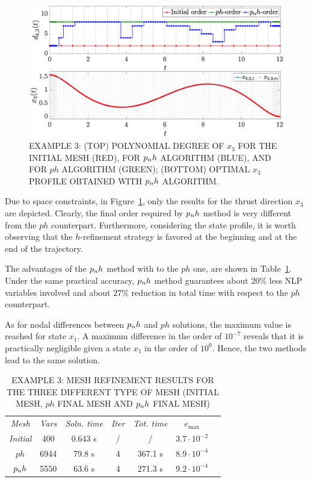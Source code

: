 \begin{figure}[t]
	\centering
	\includegraphics[trim={1cm 0.1cm 2cm 1.05cm},clip,width=1.\linewidth]{Img/pnh1_free}
	\caption{EXAMPLE 3: (TOP) POLYNOMIAL DEGREE OF $x_{3}$ FOR THE INITIAL MESH (RED), FOR $p_{n}h$ ALGORITHM (BLUE), AND FOR $ph$ ALGORITHM (GREEN); (BOTTOM) OPTIMAL $x_3$ PROFILE OBTAINED WITH $p_{n}h$ ALGORITHM.}
	\label{fig:pnh1free}
\end{figure}

Due to space constraints, in Figure~\ref{fig:pnh1free}, only the results for the thrust direction $x_3$ are depicted. Clearly, the final order required by $p_{n}h$ method is very different from the $ph$ counterpart. Furthermore, considering the state profile, it is worth observing that the $h$-refinement strategy is favored at the beginning and at the end of the trajectory.

The advantages of the $p_{n}h$ method with to the $ph$ one, are shown in Table~\ref{tab:tablefree}. Under the same practical accuracy, $p_{n}h$ method guarantees about $20\%$ less NLP variables involved and about $27\%$ reduction in total time with respect to the $ph$ counterpart.

As for nodal differences between $p_{n}h$ and $ph$ solutions, the maximum value is reached for state $x_1$. A maximum difference in the order of $10^{-7}$ reveals that it is practically negligible given a state $x_1$ in the order of $10^0$. Hence, the two methods lead to the same solution.
\begin{table}[t]
	\caption{EXAMPLE 3: MESH REFINEMENT RESULTS FOR THE THREE DIFFERENT TYPE OF MESH (INITIAL MESH, $ph$ FINAL MESH AND $p_{n}h$ FINAL MESH)}
	\begin{center}
		\label{tab:tablefree}
		\begin{tabular}{c c c c c c c}
			& & \\ %
			\hline
			\emph{Mesh} & \emph{Vars} & \emph{Soln. time} & \emph{Iter} & \emph{Tot. time} & $e_\text{max}$ \\
			\hline
			\emph{Initial} & 400 & 0.643 s & / & / &  $3.7 \cdot 10^{-2}$\\
			$ph$  & 6944 & 79.8 s & 4 & 367.1 s & $8.9\cdot 10^{-4}$ \\
			$p_{n}h$ & 5550 & 63.6 s & 4 & 271.3 s & $9.2\cdot 10^{-4}$ \\
			\hline
		\end{tabular}
	\end{center}
\end{table}



